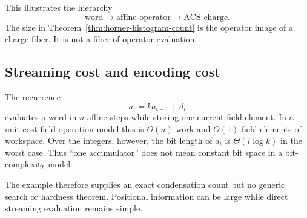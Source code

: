 This illustrates the hierarchy
\[
  \text{word}
  \longrightarrow
  \text{affine operator}
  \longrightarrow
  \text{ACS charge}.
\]
The size in Theorem~\ref{thm:horner-histogram-count} is the operator image of a
charge fiber.  It is not a fiber of operator evaluation.

\subsection{Streaming cost and encoding cost}

The recurrence
\[
  a_i=ka_{i-1}+d_i
\]
evaluates a word in $n$ affine steps while storing one current field element.
In a unit-cost field-operation model this is $O(n)$ work and $O(1)$ field
elements of workspace.  Over the integers, however, the bit length of $a_i$
is $\Theta(i\log k)$ in the worst case.  Thus ``one accumulator'' does not mean
constant bit space in a bit-complexity model.

The example therefore supplies an exact condensation count but no generic
search or hardness theorem.  Positional information can be large while direct
streaming evaluation remains simple.
